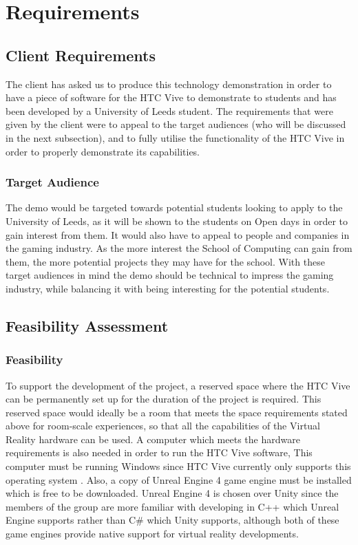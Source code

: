 \chapter{Requirements}
\label{chapter3}

\section{Client Requirements}
	The client has asked us to produce this technology demonstration in order to have a piece of software for the HTC Vive to demonstrate to students and has been developed by a University of Leeds student. The requirements that were given by the client were to appeal to the target audiences (who will be discussed in the next subsection), and to fully utilise the functionality of the HTC Vive in order to properly demonstrate its capabilities.

\subsection{Target Audience}
The demo would be targeted towards potential students looking to apply to the University of Leeds, as it will be shown to the students on Open days in order to gain interest from them.
It would also have to appeal to people and companies in the gaming industry. As the more interest the School of Computing can gain from them, the more potential projects they may have for the school.
With these target audiences in mind the demo should be technical to impress the gaming industry, while balancing it with being interesting for the potential students.

\section{Feasibility Assessment}
\subsection{Feasibility}
To support the development of the project, a reserved space where the HTC Vive can be permanently set up for the duration of the project is required. This reserved space would ideally be a room that meets the space requirements stated above for room-scale experiences, so that all the capabilities of the Virtual Reality hardware can be used. A computer which meets the hardware requirements is also needed in order to run the HTC Vive software, This computer must be running Windows since HTC Vive currently only supports this operating system \cite{vivenolinux}. Also, a copy of Unreal Engine 4 game engine must be installed which is free to be downloaded. Unreal Engine 4 is chosen over Unity since the members of the group are more familiar with developing in C++ which Unreal Engine supports rather than C\# which Unity supports, although both of these game engines provide native support for virtual reality developments.\\

